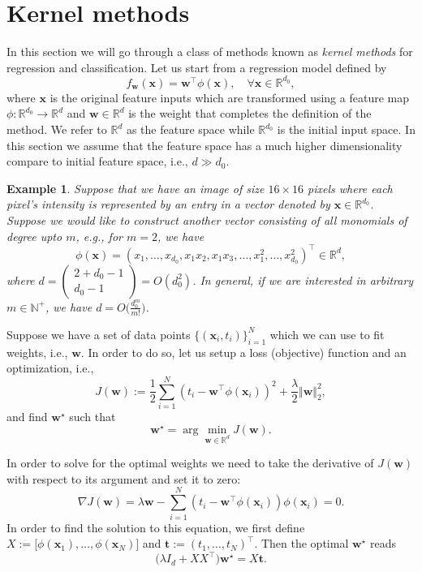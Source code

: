 \documentclass[11pt]{article}
\newcommand{\w}{\textbf{w}}
\newcommand{\x}{\textbf{x}}
\newcommand{\R}{\mathbb{R}}
\newcommand{\N}{\mathbb{N}}
\newcommand{\norm}[1]{\Vert #1 \Vert}
\newcommand{\bo}[1]{{\mathbf #1}}
\newcommand{\Arr}[2]{
	\left(
		\begin{array}{c}
		{#1} 
		\\
		{#2}
		\end{array}
	\right)
}
\newtheorem{example}{Example}[section]
\begin{document}
\section{Kernel methods}
In this section we will go through a class of methods known as {\it kernel
methods} for regression and classification. Let us start from a
regression model defined by
\begin{equation}
  f_\w(\x) = \w^\top \phi(\x), \quad \forall \x \in \R^{d_0},
\end{equation}
where $\x$ is the original feature inputs which are transformed using a
feature map $\phi: \R^{d_0} \rightarrow \R^{d}$ and $\w \in \R^{d}$ is
the weight that completes the definition of the method. We refer to
$\R^{d}$ as the feature space while $\R^{d_0}$ is the initial input
space. In this section we assume that the feature space has a much
higher dimensionality compare to initial feature space, i.e., $d \gg
d_0$.

\begin{example} \label{example:kernel}
  Suppose that we have an image of size $16 \times 16$ pixels where
  each pixel's intensity is represented by an entry in a vector
  denoted by $\x \in \R^{d_0}$. Suppose we would like to construct
  another vector consisting of all monomials of degree upto $m$, e.g.,
  for $m=2$, we have
  \begin{equation}
    \phi(\x) = (x_1, \dots, x_{d_0}, x_1 x_2, x_1 x_3, \dots,
    x_1^2, \dots, x_{d_0}^2)^\top \in \R^{d},
  \end{equation}
  where $d = \Arr{2+  d_0 - 1}{d_0 - 1} = O(d_0^2)$. In general, if we
  are interested in arbitrary $m \in \N^+$, we have
  $d = O\big( \frac{d_0^m}{m!} \big)$.
\end{example}

Suppose we have a set of data points $\{(\x_i, t_i)\}_{i=1}^{N}$ which
we can use to fit weights, i.e., $\w$. In order to do so, let us setup
a loss (objective) function and an optimization, i.e.,
\begin{equation}
  J(\w) := \frac12 \sum_{i=1}^{N} (t_i - \w^\top \phi(\x_i))^2 +
  \frac{\lambda}{2} \norm{\w}_2^2,
\end{equation}
and find $\w^\star$ such that
\begin{equation}
  \w^\star = \arg \min_{\w \in \R^{d}} J(\w).
\end{equation}

In order to solve for the optimal weights we need to take the
derivative of $J(\w)$ with respect to its argument and set it to
zero:
\begin{equation}
  \nabla J(\w) = \lambda \w - \sum_{i=1}^{N} (t_i - \w^\top \phi(\x_i)) \phi(\x_i)
  = 0.
\end{equation}
In order to find the solution to this equation, we first define
$X:=\big[\phi(\x_1), \dots, \phi(\x_N) \big]$ and $\bo{t} := (t_1,
\dots, t_N)^\top$. Then the optimal
$\w^\star$ reads
\begin{equation}
  \big( \lambda I_d + X X^\top \big) \w^\star = X \bo{t}.
\end{equation}
\end{document}
